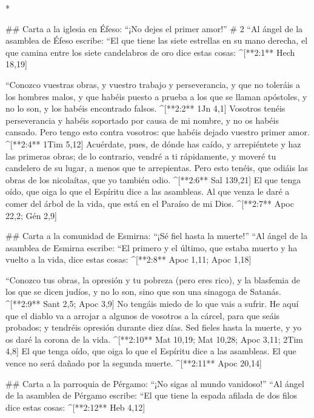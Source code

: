 \begin{paracols}{2}
\begin{english}
\end{english}
\switchcolumn[0]*

## Carta a la iglesia en Éfeso: “¡No dejes el primer amor!”
# 2
 “Al ángel de la asamblea de Éfeso escribe: “El que tiene las siete estrellas en su mano derecha, el que camina entre los siete candelabros de oro dice estas cosas: ^[**2:1** Hech 18,19]

 “Conozco vuestras obras, y vuestro trabajo y perseverancia, y que no toleráis a los hombres malos, y que habéis puesto a prueba a los que se llaman apóstoles, y no lo son, y los habéis encontrado falsos. ^[**2:2** 1Jn 4,1]  Vosotros tenéis perseverancia y habéis soportado por causa de mi nombre, y no os habéis cansado.  Pero tengo esto contra vosotros: que habéis dejado vuestro primer amor. ^[**2:4** 1Tim 5,12]  Acuérdate, pues, de dónde has caído, y arrepiéntete y haz las primeras obras; de lo contrario, vendré a ti rápidamente, y moveré tu candelero de su lugar, a menos que te arrepientas.  Pero esto tenéis, que odiáis las obras de los nicolaítas, que yo también odio. ^[**2:6** Sal 139,21]  El que tenga oído, que oiga lo que el Espíritu dice a las asambleas. Al que venza le daré a comer del árbol de la vida, que está en el Paraíso de mi Dios. ^[**2:7** Apoc 22,2; Gén 2,9]

## Carta a la comunidad de Esmirna: “¡Sé fiel hasta la muerte!”
 “Al ángel de la asamblea de Esmirna escribe: “El primero y el último, que estaba muerto y ha vuelto a la vida, dice estas cosas: ^[**2:8** Apoc 1,11; Apoc 1,18]

 “Conozco tus obras, la opresión y tu pobreza (pero eres rico), y la blasfemia de los que se dicen judíos, y no lo son, sino que son una sinagoga de Satanás. ^[**2:9** Sant 2,5; Apoc 3,9]  No tengáis miedo de lo que vais a sufrir. He aquí que el diablo va a arrojar a algunos de vosotros a la cárcel, para que seáis probados; y tendréis opresión durante diez días. Sed fieles hasta la muerte, y yo os daré la corona de la vida. ^[**2:10** Mat 10,19; Mat 10,28; Apoc 3,11; 2Tim 4,8]  El que tenga oído, que oiga lo que el Espíritu dice a las asambleas. El que vence no será dañado por la segunda muerte. ^[**2:11** Apoc 20,14]

## Carta a la parroquia de Pérgamo: “¡No sigas al mundo vanidoso!”
 “Al ángel de la asamblea de Pérgamo escribe: “El que tiene la espada afilada de dos filos dice estas cosas: ^[**2:12** Heb 4,12]


\end{paracols}
